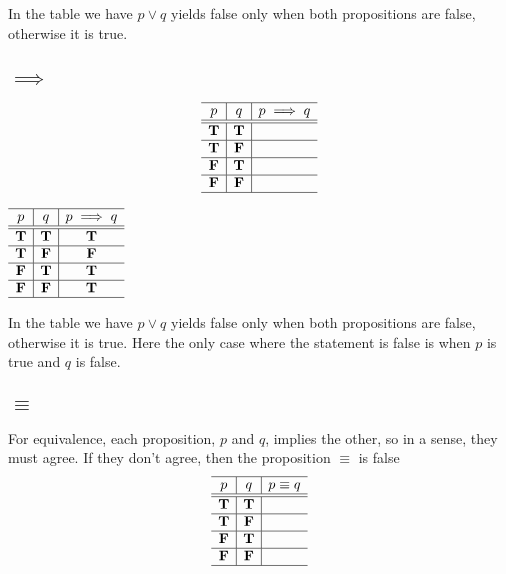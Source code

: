    
 
  In the table we have $p\lor q$ yields false only when both propositions are false, otherwise it is true.
  
\subsection*{\Huge$\implies$}
\[  \begin{array}{c|c|c}
  \hline  
  p & q & p\implies q\\
  \hline
  \hline
 \mathbf{T} &  \mathbf{T}& \\
  \hline
 \mathbf{T} & \mathbf{F}  &\\
  \hline
 \mathbf{F} &  \mathbf{T}  &  \\
  \hline
 \mathbf{F} &  \mathbf{F}  & \\
    \hline
    \end{array}\]
    

\ifKey
\color{red}
\hfill 
 $\begin{array}{c|c|c}
  \hline  
  p & q & p\implies q\\
  \hline
  \hline
 \mathbf{T} &  \mathbf{T} &  \mathbf{T}\\
  \hline
 \mathbf{T} &  \mathbf{F} &  \mathbf{F}\\
  \hline
 \mathbf{F} &  \mathbf{T} &  \mathbf{T}\\
  \hline
 \mathbf{F} &  \mathbf{F} &  \mathbf{T}\\
    \hline
    \end{array}$
\color{black}
\fi
    
    
  In the table we have $p\lor q$ yields false only when both propositions are false, otherwise it is true.  Here the only case where the statement is false is when $p$ is true and $q$ is false.
  
  \subsection*{\Huge$\equiv$}
For equivalence, each proposition, $p$ and $q$, implies the other, so in a sense, they must agree.  If they don't agree, then the proposition $\equiv$ is false
\[  \begin{array}{c|c|c}
  \hline  
  p & q & p\equiv q\\
  \hline
  \hline
 \mathbf{T} &  \mathbf{T} & \\
  \hline
 \mathbf{T} &  \mathbf{F} & \\
  \hline
 \mathbf{F} &  \mathbf{T} & \\
  \hline
 \mathbf{F} &  \mathbf{F} &\\
    \hline
    \end{array}\]


